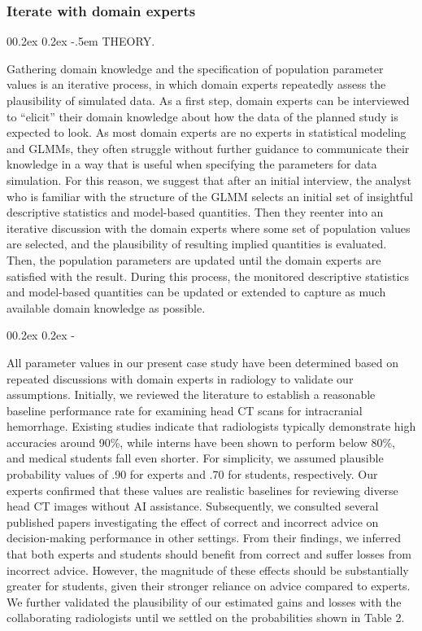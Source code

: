 \documentclass[
  man,
  floatsintext,
  longtable,
  a4paper,
  nolmodern,
  notxfonts,
  notimes,
  colorlinks=true,linkcolor=blue,citecolor=blue,urlcolor=blue]{apa7}
\makeatletter
\renewcommand{\paragraph}{\@startsection{paragraph}{4}{\parindent}%
	{0\baselineskip \@plus 0.2ex \@minus 0.2ex}%
	{-.5em}%
	{\normalfont\normalsize\bfseries\typesectitle}}
\renewcommand{\subparagraph}[1]{\@startsection{subparagraph}{5}{0.5em}%
	{0\baselineskip \@plus 0.2ex \@minus 0.2ex}%
	{-\z@\relax}%
	{\normalfont\normalsize\bfseries\itshape\hspace{\parindent}{#1}\textit{\addperi}}{\relax}}
\makeatother
\begin{document}
\subsubsection{Iterate with domain
experts}\label{iterate-with-domain-experts}

\paragraph{THEORY.}\label{theory-5}

Gathering domain knowledge and the specification of population parameter
values is an iterative process, in which domain experts repeatedly
assess the plausibility of simulated data. As a first step, domain
experts can be interviewed to ``elicit'' their domain knowledge about
how the data of the planned study is expected to look. As most domain
experts are no experts in statistical modeling and GLMMs, they often
struggle without further guidance to communicate their knowledge in a
way that is useful when specifying the parameters for data simulation.
For this reason, we suggest that after an initial interview, the analyst
who is familiar with the structure of the GLMM selects an initial set of
insightful descriptive statistics and model-based quantities. Then they
reenter into an iterative discussion with the domain experts where some
set of population values are selected, and the plausibility of resulting
implied quantities is evaluated. Then, the population parameters are
updated until the domain experts are satisfied with the result. During
this process, the monitored descriptive statistics and model-based
quantities can be updated or extended to capture as much available
domain knowledge as possible.

\subparagraph{PRACTICE.}\label{practice-5}

All parameter values in our present case study have been determined
based on repeated discussions with domain experts in radiology to
validate our assumptions. Initially, we reviewed the literature to
establish a reasonable baseline performance rate for examining head CT
scans for intracranial hemorrhage. Existing studies indicate that
radiologists typically demonstrate high accuracies around 90\%, while
interns have been shown to perform below 80\%, and medical students fall
even shorter. For simplicity, we assumed plausible probability values of
.90 for experts and .70 for students, respectively. Our experts
confirmed that these values are realistic baselines for reviewing
diverse head CT images without AI assistance. Subsequently, we consulted
several published papers investigating the effect of correct and
incorrect advice on decision-making performance in other settings. From
their findings, we inferred that both experts and students should
benefit from correct and suffer losses from incorrect advice. However,
the magnitude of these effects should be substantially greater for
students, given their stronger reliance on advice compared to experts.
We further validated the plausibility of our estimated gains and losses
with the collaborating radiologists until we settled on the
probabilities shown in Table 2.
\end{document}
